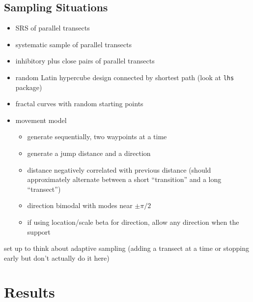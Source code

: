 \documentclass[review]{elsarticle}
\begin{document}
\subsection{Sampling Situations}

\begin{itemize}

\item SRS of parallel transects

\item systematic sample of parallel transects

\item inhibitory plus close pairs of parallel transects

\item random Latin hypercube design connected by shortest path (look at
\texttt{lhs} package)

\item fractal curves with random starting points

\item movement model
\begin{itemize}
\item generate sequentially, two waypoints at a time
\item generate a jump distance and a direction
\item distance negatively correlated with previous distance (should
approximately alternate between a short ``transition'' and a long ``transect'')
\item direction bimodal with modes near \(\pm \pi / 2\)
\item if using location/scale beta for direction, allow any direction when the
support 
\end{itemize}

\end{itemize}

set up to think about adaptive sampling (adding a transect at a time or
stopping early but don't actually do it here)




\section{Results}
\end{document}
